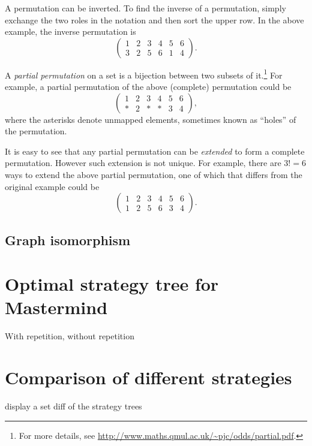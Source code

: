A permutation can be inverted. To find the inverse of a permutation, simply exchange the two roles in the notation and then sort the upper row. In the above example, the inverse permutation is
\[
\begin{pmatrix}
1 & 2 & 3 & 4 & 5 & 6 \\
3 & 2 & 5 & 6 & 1 & 4
\end{pmatrix} .
\]


A \emph{partial permutation} on a set is a bijection between two subsets of it.\footnote{For more details, see \url{http://www.maths.qmul.ac.uk/~pjc/odds/partial.pdf}.}
For example, a partial permutation of the above (complete) permutation could be
\[
\begin{pmatrix}
1 & 2 & 3 & 4 & 5 & 6 \\
* & 2 & * & * & 3 & 4
\end{pmatrix} ,
\]
where the asterisks denote unmapped elements, sometimes known as ``holes'' of the permutation. 

It is easy to see that any partial permutation can be \emph{extended} to form a complete permutation. However such extension is not unique. For example, there are $3! = 6$ ways to extend the above partial permutation, one of which that differs from the original example could be
\[
\begin{pmatrix}
1 & 2 & 3 & 4 & 5 & 6 \\
1 & 2 & 5 & 6 & 3 & 4
\end{pmatrix} .
\]

\subsection{Graph isomorphism}

\section{Optimal strategy tree for Mastermind}

With repetition, without repetition

\section{Comparison of different strategies}

display a set diff of the strategy trees